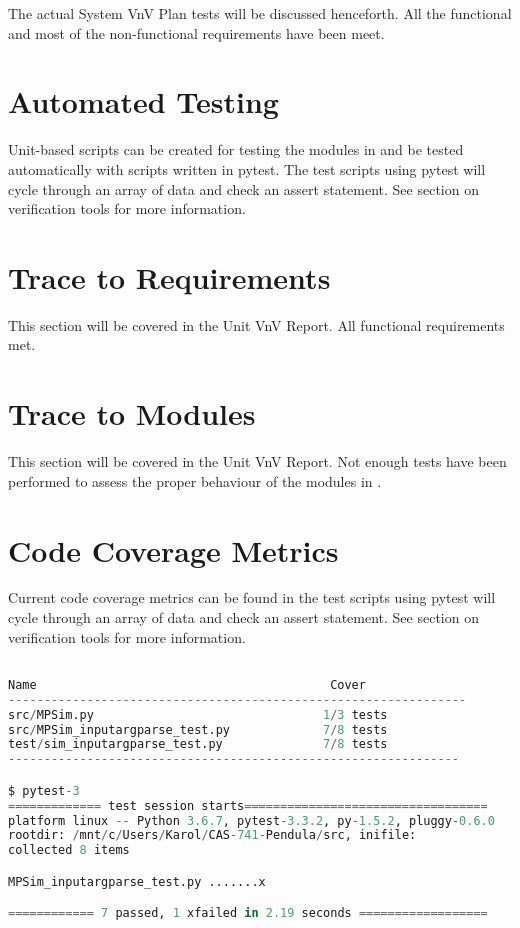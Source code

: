 \documentclass[12pt, titlepage]{article}
\begin{document}
The actual System VnV Plan tests will be discussed henceforth. All 
the functional and most of the non-functional requirements have been meet.

\section{Automated Testing}

Unit-based scripts can be created for testing the modules in \progname{}and be tested automatically with 
scripts written in pytest. The test scripts using pytest will cycle through an array of data and check an assert 
statement. See section on verification tools for more information.
		
\section{Trace to Requirements}

This section will be covered in the Unit VnV Report. All functional requirements met.
		
\section{Trace to Modules}		

This section will be covered in the Unit VnV Report.
Not enough tests have been performed to assess the proper behaviour of the 
modules in \progname{}.	

\section{Code Coverage Metrics}

Current code coverage metrics can be found in the test scripts 
using pytest will cycle through an array of data and check an assert 
statement. See section on verification tools for more information.

\begin{lstlisting}[language=python, showstringspaces=false]

Name                                         Cover
----------------------------------------------------------------
src/MPSim.py                                1/3 tests
src/MPSim_inputargparse_test.py             7/8 tests
test/sim_inputargparse_test.py              7/8 tests
---------------------------------------------------------------

$ pytest-3
============= test session starts==================================
platform linux -- Python 3.6.7, pytest-3.3.2, py-1.5.2, pluggy-0.6.0
rootdir: /mnt/c/Users/Karol/CAS-741-Pendula/src, inifile:
collected 8 items

MPSim_inputargparse_test.py .......x                                                                                                                               [100%]

============ 7 passed, 1 xfailed in 2.19 seconds ==================
\end{lstlisting}




\end{document}
